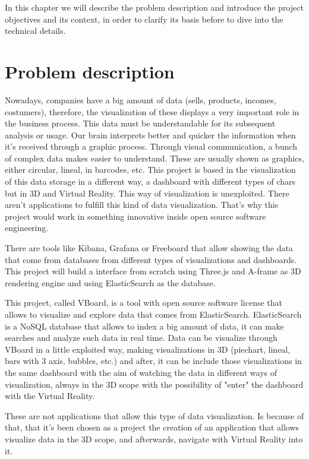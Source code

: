 \documentclass[a4paper, 12pt]{book}
\begin{document}
In this chapter we will describe the problem description and introduce the project objectives and its context, in order to clarify its basis before to dive into the technical details.

\section{Problem description}
\label{sec:probdescr}

Nowadays, companies have a big amount of data (sells, products, incomes, costumers), therefore, the visualization of these displays a very important role in the business process. This data must be understandable for its subsequent analysis or usage. Our brain interprets better and quicker the information when it's received through a graphic process. Through visual communication, a bunch of complex data makes easier to understand. These are usually shown as graphics, either circular, lineal, in barcodes, etc. This project is based in the visualization of this data storage in a different way, a dashboard with different types of chars but in 3D and Virtual Reality. This way of visualization is unexploited. There aren't applications to fulfill this kind of data visualization. That's why this project would work in something innovative inside open source software engineering.

There are tools like Kibana, Grafana or Freeboard that allow showing the data that come from databases from different types of visualizations and dashboards. This project will build a interface from scratch using Three.js and A-frame as 3D rendering engine and using ElasticSearch as the database.

This project, called VBoard, is a tool with open source software license that allows to visualize and explore data that comes from ElasticSearch. ElasticSearch is a NoSQL database that allows to index a big amount of data, it can make searches and analyze such data in real time. Data can be visualize through VBoard in a little exploited way, making visualizations in 3D (piechart, lineal, bars with 3 axis, bubbles, etc.) and after, it can be include those visualizations in the same dashboard with the aim of watching the data in different ways of visualization, always in the 3D scope with the possibility of "enter" the dashboard with the Virtual Reality.

These are not applications that allow this type of data visualization. Is because of that, that it's been chosen as a project the creation of an application that allows visualize data in the 3D scope, and afterwards, navigate with Virtual Reality into it.
\end{document}

